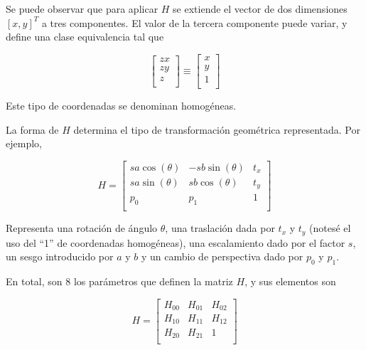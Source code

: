 Se puede observar que para aplicar $H$ se extiende el vector de dos dimensiones $[x,y]^{T}$ a tres componentes. El valor de la
tercera componente puede variar, y define una clase equivalencia tal que

\begin{equation}
    \begin{bmatrix}
        zx \\
        zy \\
        z \\
    \end{bmatrix}
    \equiv
    \begin{bmatrix}
        x \\
        y \\
        1 \\
    \end{bmatrix}
\end{equation}

Este tipo de coordenadas se denominan homogéneas.

La forma de $H$ determina el tipo de transformación geométrica representada. Por ejemplo,

\begin{equation}
    H =
    \begin{bmatrix}
        sa\cos(\theta) & -sb\sin(\theta) & t_{x}\\
        sa\sin(\theta) & sb\cos(\theta) & t_{y} \\
        p_{0}          & p_{1}          & 1     \\
    \end{bmatrix}
\end{equation}

Representa una rotación de ángulo $\theta$, una traslación dada por $t_{x}$ y $t_{y}$ (notesé el uso del ``1'' de coordenadas
homogéneas), una escalamiento dado por el factor $s$, un sesgo introducido por $a$ y $b$ y un cambio de perspectiva
dado por $p_{0}$ y $p_{1}$.

En total, son 8 los parámetros que definen la matriz $H$, y sus elementos son

\begin{equation}
    H =
    \begin{bmatrix}
        H_{00} & H_{01} & H_{02}\\
        H_{10} & H_{11} & H_{12}\\
        H_{20} & H_{21} & 1\\
    \end{bmatrix}
\end{equation}


